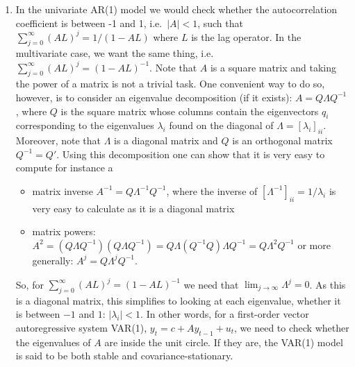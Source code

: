 \begin{enumerate}

\item 
In the univariate AR(1) model we would check whether the autocorrelation coefficient is between -1 and 1, 
  i.e.\ $|A|<1$, such that $\sum_{j=0}^\infty (AL)^j=1/(1-AL)$ where $L$ is the lag operator.
In the multivariate case, we want the same thing, i.e.\ $\sum_{j=0}^\infty (AL)^j=(1-AL)^{-1}$.
Note that $A$ is a square matrix and taking the power of a matrix is not a trivial task.
One convenient way to do so, however, is to consider an eigenvalue decomposition (if it exists):
$A= Q \Lambda Q^{-1}$, where $Q$ is the square matrix
  whose columns contain the eigenvectors $q_i$ corresponding to the eigenvalues $\lambda_i$ found on the diagonal of $\Lambda = [\lambda_i]_{ii}$.
Moreover, note that $\Lambda$ is a diagonal matrix and $Q$ is an orthogonal matrix $Q^{-1}=Q'$.
Using this decomposition one can show that it is very easy to compute for instance a
\begin{itemize}
  \item matrix inverse $A^{-1} = Q \Lambda^{-1} Q^{-1}$,
    where the inverse of $[\Lambda^{-1}]_{ii} = 1/\lambda_i$ is very easy to calculate as it is a diagonal matrix
	\item matrix powers: $A^2=(Q\Lambda Q^{-1})(Q\Lambda Q^{-1})=Q\Lambda (Q^{-1}Q) \Lambda Q^{-1} = Q \Lambda^2 Q^{-1}$
	or more generally: $A^j = Q \Lambda^j Q^{-1}$.
\end{itemize}
So, for $\sum_{j=0}^\infty (AL)^j=(1-AL)^{-1}$ we need that $\lim_{j\rightarrow \infty}\Lambda^j=0$.
As this is a diagonal matrix, this simplifies to looking at each eigenvalue, whether it is between $-1$ and $1$: $|\lambda_i|<1$.
In other words, for a first-order vector autoregressive system VAR(1), $y_t = c + A y_{t-1} + u_t$,
  we need to check whether the eigenvalues of $A$ are inside the unit circle.
If they are, the VAR(1) model is said to be both stable and covariance-stationary.


\end{enumerate}
